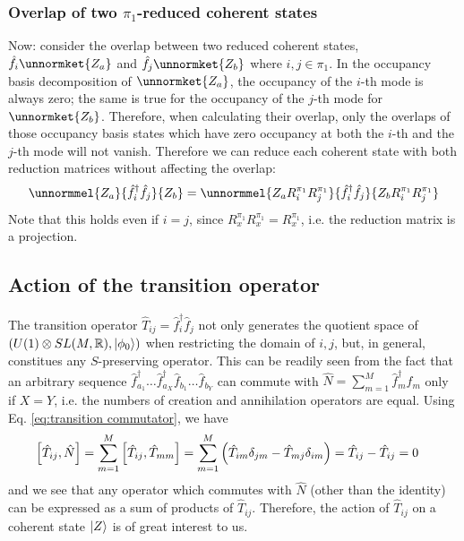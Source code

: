 \documentclass[12pt]{article}
\newcommand{\hc}{^\dagger}
\begin{document}
	\subsubsection{Overlap of two $\pi_1$-reduced coherent states}
	Now: consider the overlap between two reduced coherent states, $\hat{f}_i\unnormket{Z_a}$ and $\hat{f}_j\unnormket{Z_b}$ where $i,j\in \pi_1$. In the occupancy basis decomposition of $\unnormket{Z_a}$, the occupancy of the $i$-th mode is always zero; the same is true for the occupancy of the $j$-th mode for $\unnormket{Z_b}$. Therefore, when calculating their overlap, only the overlaps of those occupancy basis states which have zero occupancy at both the $i$-th and the $j$-th mode will not vanish. Therefore we can reduce each coherent state with both reduction matrices without affecting the overlap:
	\begin{equation}
	\unnormmel{Z_a}{\hat{f}\hc_i\hat{f}_j}{Z_b}=\unnormmel{Z_aR^{\pi_1}_iR^{\pi_1}_j}{\hat{f}\hc_i\hat{f}_j}{Z_bR^{\pi_1}_iR^{\pi_1}_j}
	\end{equation}
	Note that this holds even if $i=j$, since $R^{\pi_1}_xR^{\pi_1}_x=R^{\pi_1}_x$, i.e. the reduction matrix is a projection.
	
	\subsection{Action of the transition operator}
	
	The transition operator $\hat{T}_{ij}=\hat{f}\hc_i\hat{f}_j$ not only generates the quotient space of $(U(1)\otimes SL(M,\mathbb{R}), \ket{\phi_0})$ when restricting the domain of $i,j$, but, in general, constitues any $S$-preserving operator. This can be readily seen from the fact that an arbitrary sequence $\hat{f}\hc_{a_1}\dots\hat{f}\hc_{a_X}\hat{f}_{b_1}\dots\hat{f}_{b_Y}$ can commute with $\hat{N}=\sum_{m=1}^M\hat{f}\hc_m\hat{f}_m$ only if $X=Y$, i.e. the numbers of creation and annihilation operators are equal. Using Eq. \ref{eq:transition commutator}, we have
	\begin{align}\label{eq:transition commutes with N}
	\comm{\hat{T}_{ij}}{\hat{N}}&=\sum_{m=1}^M\comm{\hat{T}_{ij}}{\hat{T}_{mm}}=\sum_{m=1}^M\left(\hat{T}_{im}\delta_{jm}-\hat{T}_{mj}\delta_{im}\right)=\hat{T}_{ij}-\hat{T}_{ij}=0
	\end{align}
	and we see that any operator which commutes with $\hat{N}$ (other than the identity) can be expressed as a sum of products of $\hat{T}_{ij}$. Therefore, the action of $\hat{T}_{ij}$ on a coherent state $\ket{Z}$ is of great interest to us.
	
\end{document}
